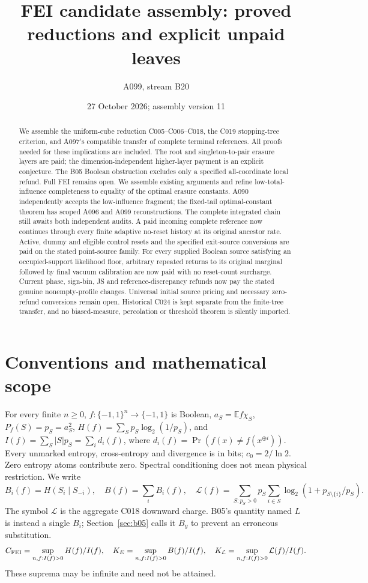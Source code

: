 \documentclass[11pt]{article}
\title{FEI candidate assembly: proved reductions and explicit unpaid leaves}
\author{A099, stream B20}
\date{27 October 2026; assembly version 11}
\newcommand{\E}{\mathbb E}
\begin{document}
\maketitle
\begin{abstract}
We assemble the uniform-cube reduction C005--C006--C018, the
C019 stopping-tree criterion, and A097's compatible transfer of complete
terminal references. All proofs needed for these implications are included.
The root and singleton-to-pair erasure layers are paid; the
dimension-independent higher-layer payment is an explicit conjecture.
The B05 Boolean obstruction excludes only a specified all-coordinate local
refund. Full FEI remains open. We assemble existing arguments and refine
low-total-influence completeness to equality of the optimal erasure constants.
A090 independently accepts the low-influence fragment; the fixed-tail
optimal-constant theorem has scoped A096 and A099 reconstructions.
The complete integrated chain still awaits both independent audits.
A paid incoming complete reference now continues through every finite
adaptive no-reset history at its original ancestor rate. Active, dummy and eligible control resets and the specified exit-source
conversions are paid on the stated point-source family. For every supplied Boolean source satisfying an occupied-support likelihood
floor, arbitrary repeated returns to its original marginal followed by
final vacuum calibration are now paid with no reset-count surcharge.
Current phase, sign-bin, JS and reference-discrepancy refunds now pay
the stated genuine nonempty-profile changes. Universal initial source
pricing and necessary zero-refund conversions remain open.
Historical C024 is kept separate from the
finite-tree transfer, and no biased-measure, percolation or threshold theorem
is silently imported.
\end{abstract}

\section{Conventions and mathematical scope}
For every finite $n\ge0$, $f:\{-1,1\}^n\to\{-1,1\}$ is Boolean,
$a_S=\E f\chi_S$, $P_f(S)=p_S=a_S^2$,
$H(f)=\sum_Sp_S\log_2(1/p_S)$, and
$I(f)=\sum_S|S|p_S=\sum_i d_i(f)$, where
$d_i(f)=\Pr(f(x)\ne f(x^{\oplus i}))$.
Every unmarked entropy, cross-entropy and divergence is in bits;
$c_0=2/\ln2$. Zero entropy atoms contribute zero. Spectral conditioning
does not mean physical restriction. We write
\[
 B_i(f)=H(S_i\mid S_{-i}),\quad B(f)=\sum_i B_i(f),\quad
 \mathcal L(f)=\sum_{S:p_S>0}p_S\sum_{i\in S}
                    \log_2(1+p_{S\setminus\{i\}}/p_S).
\]
The symbol $\mathcal L$ is the aggregate C018 downward charge. B05's
quantity named $L$ is instead a single $B_i$; Section~\ref{sec:b05}
calls it $B_y$ to prevent an erroneous substitution.
\[
C_{\rm FEI}=\sup_{n,f:I(f)>0} H(f)/I(f),\quad
K_E=\sup_{n,f:I(f)>0} B(f)/I(f),\quad
K_{\mathcal L}=\sup_{n,f:I(f)>0}\mathcal L(f)/I(f).
\]
These suprema may be infinite and need not be attained.
\end{document}
